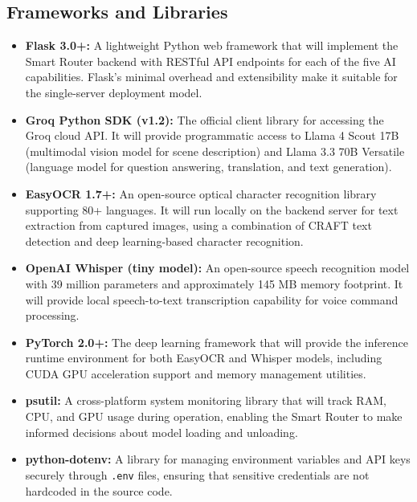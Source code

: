 \subsection{Frameworks and Libraries}
\begin{itemize}[leftmargin=1.5cm]
\item \textbf{Flask 3.0+:} A lightweight Python web framework that will implement the Smart Router backend with RESTful API endpoints for each of the five AI capabilities. Flask's minimal overhead and extensibility make it suitable for the single-server deployment model.

\item \textbf{Groq Python SDK (v1.2):} The official client library for accessing the Groq cloud API. It will provide programmatic access to Llama 4 Scout 17B (multimodal vision model for scene description) and Llama 3.3 70B Versatile (language model for question answering, translation, and text generation).

\item \textbf{EasyOCR 1.7+:} An open-source optical character recognition library supporting 80+ languages. It will run locally on the backend server for text extraction from captured images, using a combination of CRAFT text detection and deep learning-based character recognition.

\item \textbf{OpenAI Whisper (tiny model):} An open-source speech recognition model with 39 million parameters and approximately 145 MB memory footprint. It will provide local speech-to-text transcription capability for voice command processing.

\item \textbf{PyTorch 2.0+:} The deep learning framework that will provide the inference runtime environment for both EasyOCR and Whisper models, including CUDA GPU acceleration support and memory management utilities.

\item \textbf{psutil:} A cross-platform system monitoring library that will track RAM, CPU, and GPU usage during operation, enabling the Smart Router to make informed decisions about model loading and unloading.

\item \textbf{python-dotenv:} A library for managing environment variables and API keys securely through \texttt{.env} files, ensuring that sensitive credentials are not hardcoded in the source code.
\end{itemize}

